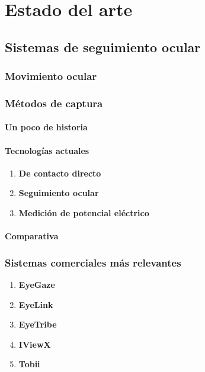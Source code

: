 \documentclass[../main.tex]{subfiles}
\begin{document}
		
\chapter{Estado del arte}
\label{cha:02_02_estado_del_arte}
\section{Sistemas de seguimiento ocular}
\label{sec:02_sistemas_de_seguimiento_ocular}


	\subsection{Movimiento ocular}
	\label{sub:02_movimiento_ocular}

	
	
	\subsection{Métodos de captura}
	\label{sub:02_métodos_de_captura}
		\subsubsection{Un poco de historia}
		\label{ssub:02_un_poco_de_historia}

		\subsubsection{Tecnologías actuales}
		\label{ssub:02_tecnologías_actuales}
			\begin{enumerate}
				\item \textbf{De contacto directo}

				\item \textbf{Seguimiento ocular}

				\item \textbf{Medición de potencial eléctrico}

			\end{enumerate}

		\subsubsection{Comparativa}
		\label{ssub:02_comparativa_eyetracker}
		
	\subsection{Sistemas comerciales más relevantes}
	\label{sub:02_sistemas_comerciales_más_relevantes}
		\begin{enumerate}
			\item \textbf{EyeGaze}

			\item \textbf{EyeLink}

			\item \textbf{EyeTribe}

			\item \textbf{IViewX}

			\item \textbf{Tobii}

		\end{enumerate}
\end{document}
